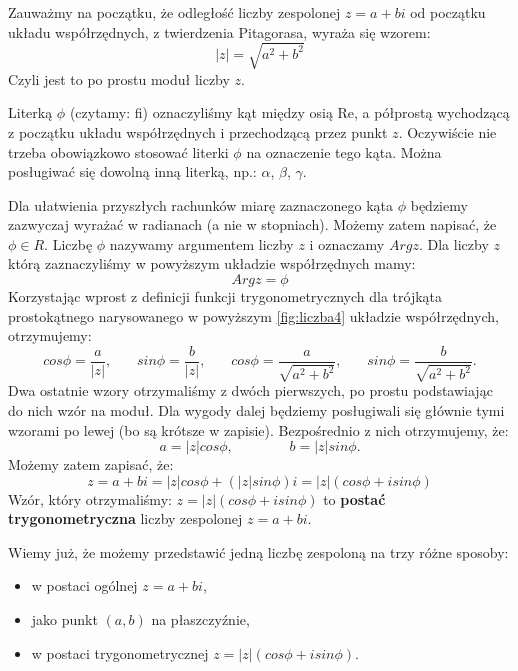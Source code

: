 \documentclass[a4paper,12pt]{article}
\begin{document}
Zauważmy na początku, że odległość liczby zespolonej $z=a+bi$ od początku układu współrzędnych, z twierdzenia Pitagorasa, wyraża się wzorem:
\begin{equation}
|z|=\sqrt{a^{2}+b^{2}}
\label{eq:5}
\end{equation}
Czyli jest to po prostu moduł liczby $z$.

Literką $\phi$ (czytamy: fi) oznaczyliśmy kąt między osią Re, a półprostą wychodzącą z początku układu współrzędnych i przechodzącą przez punkt $z$.
Oczywiście nie trzeba obowiązkowo stosować literki $\phi$ na oznaczenie tego kąta. Można posługiwać się dowolną inną literką, np.: $\alpha$, $\beta$, $\gamma$.

Dla ułatwienia przyszłych rachunków miarę zaznaczonego kąta $\phi$ będziemy zazwyczaj wyrażać w radianach (a nie w stopniach). Możemy zatem napisać, że $\phi \in R$.
Liczbę $\phi$ nazywamy argumentem liczby $z$ i oznaczamy $Arg z$.
Dla liczby $z$ którą zaznaczyliśmy w powyższym układzie współrzędnych mamy:
\begin{equation}
Arg z = \phi
\label{eq:6}
\end{equation}
Korzystając wprost z definicji funkcji trygonometrycznych dla trójkąta prostokątnego narysowanego w powyższym
\ref{fig:liczba4} układzie współrzędnych, otrzymujemy:
\begin{equation}
cos \phi = \frac{a}{|z|},~~~~~~~~
sin \phi = \frac{b}{|z|},~~~~~~~~
cos \phi = \frac{a}{\sqrt{a^{2}+b^{2}}},~~~~~~~~
sin \phi = \frac{b}{\sqrt{a^{2}+b^{2}}}.
\label{eq:7}
\end{equation}
Dwa ostatnie wzory otrzymaliśmy z dwóch pierwszych, po prostu podstawiając do nich wzór na moduł. Dla wygody dalej będziemy posługiwali się głównie tymi wzorami po lewej (bo są krótsze w zapisie). Bezpośrednio z nich otrzymujemy, że:
\begin{equation}
a=|z|cos\phi,~~~~~~~~~~~~~~~~~~b=|z|sin\phi.
\label{eq:8}
\end{equation}
Możemy zatem zapisać, że:
\begin{equation}
z=a+bi=|z|cos\phi+(|z|sin\phi)i=|z|(cos\phi+i sin\phi)
\label{eq:9}
\end{equation}
Wzór, który otrzymaliśmy: $z=|z|(cos\phi+i sin\phi)$ to \textbf{postać trygonometryczna} liczby zespolonej $z=a+bi$.

Wiemy już, że możemy przedstawić jedną liczbę zespoloną na trzy różne sposoby:
\begin{itemize}
\item w postaci ogólnej $z=a+bi$,
\item jako punkt $(a, b)$ na płaszczyźnie,
\item  w postaci trygonometrycznej $z=|z|(cos\phi+i sin\phi)$.
\end{itemize}
\end{document}
